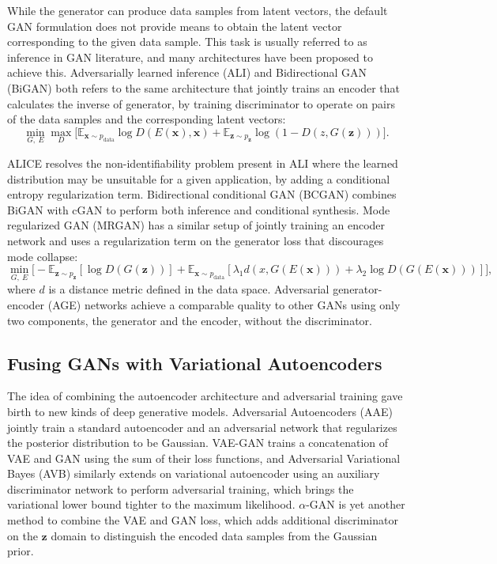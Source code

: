 While the generator can produce data samples from latent vectors, the default GAN formulation does not provide means to obtain the latent vector corresponding to the given data sample.
This task is usually referred to as inference in GAN literature, and many architectures have been proposed to achieve this.
Adversarially learned inference (ALI) \cite{dumoulin2017ali} and Bidirectional GAN (BiGAN) \cite{donahue2016bigan} both refers to the same architecture that jointly trains an encoder that calculates the inverse of generator, by training discriminator to operate on pairs of the data samples and the corresponding latent vectors:
\begin{equation}\label{eqn:bigan}
\min_{G,~E} \max_{D} \Big[ \mathbb{E}_{\bm{x} \sim p_{\mathrm{data}}} {\log D(E(\bm{x}), \bm{x})} + \mathbb{E}_{\bm{z} \sim p_{\bm{z}}} \log \left ( 1 - D(z, G(\bm{z})) \right ) \Big].
\end{equation}

ALICE \cite{li2017alice} resolves the non-identifiability problem present in ALI where the learned distribution may be unsuitable for a given application, by adding a conditional entropy regularization term.
Bidirectional conditional GAN (BCGAN) \cite{jaiswal2017bcgan} combines BiGAN with cGAN to perform both inference and conditional synthesis.
Mode regularized GAN (MRGAN) \cite{che2016mrgan} has a similar setup of jointly training an encoder network and uses a regularization term on the generator loss that discourages mode collapse:
\begin{equation}\label{eqn:mrgan}
\min_{G,~E} \Big[ - \mathbb{E}_{\bm{z} \sim p_{\bm{z}}} [ \log  D(G(\bm{z})) ]
+ \mathbb{E}_{\bm{x} \sim p_{\mathrm{data}}} [ \lambda_1 d(x, G(E(\bm{x}))) + \lambda_2 \log D(G(E(\bm{x}))) ] \Big],
\end{equation}
where $d$ is a distance metric defined in the data space.
Adversarial generator-encoder (AGE) networks \cite{ulyanov2017age} achieve a comparable quality to other GANs using only two components, the generator and the encoder, without the discriminator.

\subsection{Fusing GANs with Variational Autoencoders}

The idea of combining the autoencoder architecture and adversarial training gave birth to new kinds of deep generative models.
Adversarial Autoencoders (AAE) \cite{makhzani2015aae} jointly train a standard autoencoder and an adversarial network that regularizes the posterior distribution to be Gaussian.
VAE-GAN \cite{larsen2015vaegan} trains a concatenation of VAE and GAN using the sum of their loss functions, and Adversarial Variational Bayes (AVB) \cite{mescheder2017adversarial} similarly extends on variational autoencoder using an auxiliary discriminator network to perform adversarial training, which brings the variational lower bound tighter to the maximum likelihood.
$\alpha$-GAN \cite{rosca2017alphagan} is yet another method to combine the VAE and GAN loss, which adds additional discriminator on the $\bm{z}$ domain to distinguish the encoded data samples from the Gaussian prior.
\fi



